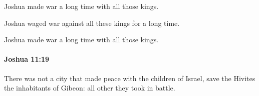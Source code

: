 			\begin{versebox}
					\item[BHS] 
					\item[ASV] Joshua made war a long time with all those kings.
					\item[NIV] Joshua waged war against all these kings for a long time.
					\item[NRSV] Joshua made war a long time with all those kings.
			\end{versebox}

		\paragraph{Joshua 11:19} %
			\label{JOSHUA-11-19}

			There was not a city that made peace with the children of Israel, save the Hivites the inhabitants of Gibeon: all other they took in battle.

